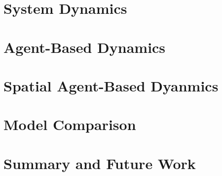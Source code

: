 \documentclass[10pt]{article}
\begin{document}
\section{System Dynamics}


\section{Agent-Based Dynamics}



\section{Spatial Agent-Based Dyanmics}



\section{Model Comparison}



\section{Summary and Future Work}



%




\end{document}
